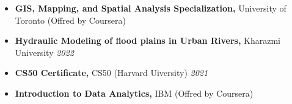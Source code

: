 \documentclass[letterpaper,11pt]{article}
\begin{document}
	\vspace{-1.2em}
	\begin{itemize}[left=0pt, label={}, topsep=7.5pt, partopsep=0pt, itemsep=6pt, parsep=0pt]
		\item \textbf{GIS, Mapping, and Spatial Analysis Specialization,} University of Toronto (Offred by Coursera) \hfill \textit{}
	\end{itemize}
	\vspace{-1.2em}
	\begin{itemize}[left=0pt, label={}, topsep=7.5pt, partopsep=0pt, itemsep=6pt, parsep=0pt]
		\item \textbf{Hydraulic Modeling of flood plains in Urban Rivers,}  Kharazmi University \hfill \textit{2022}
	\end{itemize}
	\vspace{-1.2em}
	\begin{itemize}[left=0pt, label={}, topsep=7.5pt, partopsep=0pt, itemsep=6pt, parsep=0pt]
		\item \textbf{CS50 Certificate,}  CS50 (Harvard Uiversity) \hfill \textit{2021}
	\end{itemize}
	\vspace{-1.2em}
	\begin{itemize}[left=0pt, label={}, topsep=7.5pt, partopsep=0pt, itemsep=6pt, parsep=0pt]
		\item \textbf{Introduction to Data Analytics,}  IBM (Offred by Coursera) \hfill \textit{}
	\end{itemize}
	\vspace{-1.2em}
	\vspace{-0.6em} 
\end{document}
